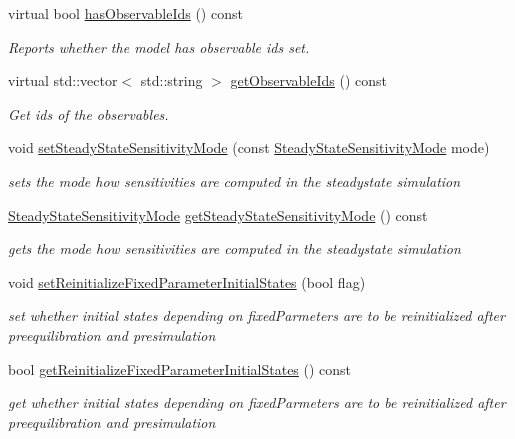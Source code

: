 \begin{DoxyCompactItemize}
virtual bool \mbox{\hyperlink{classamici_1_1_model_adb0d2d3b3aa9cd648efa3cf408d9abab}{has\+Observable\+Ids}} () const
\begin{DoxyCompactList}\small\item\em Reports whether the model has observable ids set. \end{DoxyCompactList}\item 
virtual std\+::vector$<$ std\+::string $>$ \mbox{\hyperlink{classamici_1_1_model_a13ff6d42168b4c62dedd27e274bf3192}{get\+Observable\+Ids}} () const
\begin{DoxyCompactList}\small\item\em Get ids of the observables. \end{DoxyCompactList}\item 
void \mbox{\hyperlink{classamici_1_1_model_ab8e08cf804357e3ac070c11ac9b8ec35}{set\+Steady\+State\+Sensitivity\+Mode}} (const \mbox{\hyperlink{namespaceamici_a1f7d44f04185d57423d01d47d13470a6}{Steady\+State\+Sensitivity\+Mode}} mode)
\begin{DoxyCompactList}\small\item\em sets the mode how sensitivities are computed in the steadystate simulation \end{DoxyCompactList}\item 
\mbox{\hyperlink{namespaceamici_a1f7d44f04185d57423d01d47d13470a6}{Steady\+State\+Sensitivity\+Mode}} \mbox{\hyperlink{classamici_1_1_model_abe272de7f41f621d27d169f7918ecac3}{get\+Steady\+State\+Sensitivity\+Mode}} () const
\begin{DoxyCompactList}\small\item\em gets the mode how sensitivities are computed in the steadystate simulation \end{DoxyCompactList}\item 
void \mbox{\hyperlink{classamici_1_1_model_aaf26e3d4c8b574bc7e63f8beea677bcb}{set\+Reinitialize\+Fixed\+Parameter\+Initial\+States}} (bool flag)
\begin{DoxyCompactList}\small\item\em set whether initial states depending on fixed\+Parmeters are to be reinitialized after preequilibration and presimulation \end{DoxyCompactList}\item 
bool \mbox{\hyperlink{classamici_1_1_model_a09f372616ff7bf8073c732801b666f7e}{get\+Reinitialize\+Fixed\+Parameter\+Initial\+States}} () const
\begin{DoxyCompactList}\small\item\em get whether initial states depending on fixed\+Parmeters are to be reinitialized after preequilibration and presimulation \end{DoxyCompactList}\end{DoxyCompactItemize}
